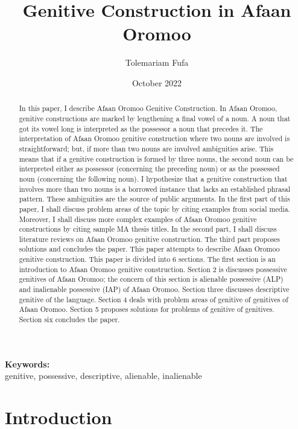 \documentclass[11pt,a4paper]{article}
\title {Genitive Construction in Afaan Oromoo}
\author {Tolemariam Fufa}
\date{October 2022}
\begin{document}
	\newcommand\keywords[1]{%
		\begingroup
		\let\and\\
		\par
		\noindent\textbf{Keywords:}\\#1\par
		\endgroup
	}
	\maketitle
	\begin{abstract}
		In this paper, I describe Afaan Oromoo Genitive Construction. In Afaan Oromoo, genitive constructions are marked by lengthening a final vowel of a noun. 
		A noun that got its vowel long is interpreted as the possessor a noun that precedes it. The interpretation of Afaan Oromoo genitive construction where 
		two nouns are involved is straightforward; but, if more than two nouns are involved ambiguities arise. This means that if a genitive construction is 
		formed by three nouns, the second noun can be interpreted either as possessor (concerning the preceding noun) or as the possessed noun (concerning the 
		following noun). I hypothesize that a genitive construction that involves more than two nouns is a borrowed instance that lacks an established phrasal 
		pattern. These ambiguities are the source of public arguments. In the first part of this paper, I shall discuss problem areas of the topic by citing 
		examples from social media. Moreover, I shall discuss more complex examples of Afaan Oromoo genitive constructions by citing sample MA thesis titles. 
		In the second part, I shall discuss literature reviews on Afaan Oromoo genitive construction. The third part proposes solutions and concludes the paper. 
		This paper attempts to describe Afaan Oromoo genitive construction.	This paper is divided into 6 sections. The first section is an introduction to Afaan Oromoo genitive construction. Section 2 is discusses possessive genitives of Afaan Oromoo; the concern of this section is alienable possessive (ALP) and inalienable possessive (IAP) of Afaan Oromoo. Section three discusses descriptive genitive of the language. Section 4 deals with problem areas of genitive of genitives of Afaan Oromoo. Section 5 proposes solutions for problems of genitive of genitives. Section six concludes the paper.
	\end{abstract}
	\keywords{genitive, possessive, descriptive, alienable, inalienable}
	\newpage
	
	\section{Introduction}
	\label{sec:org462cb4a}
	
\end{document}
